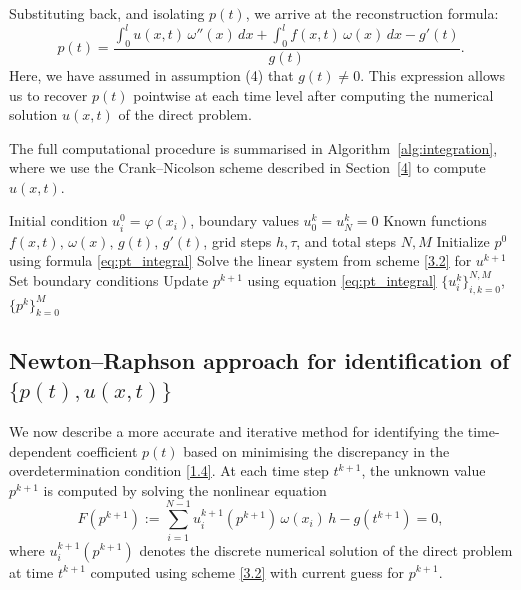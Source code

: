 \documentclass[reqno]{amsart}
\begin{document}
Substituting back, and isolating \( p(t) \), we arrive at the reconstruction formula:
\begin{equation}\label{eq:pt_integral}
p(t) = \frac{\int_0^l u(x,t)\, \omega''(x)\, dx + \int_0^l f(x,t)\, \omega(x)\, dx - g'(t) }{ g(t) }.
\end{equation}
Here, we have assumed in assumption (4) that $g(t) \neq 0$.
This expression allows us to recover \( p(t) \) pointwise at each time level after computing the numerical solution \( u(x,t) \) of the direct problem.

\medskip

The full computational procedure is summarised in Algorithm~\ref{alg:integration}, where we use the Crank–Nicolson scheme described in Section~\ref{4} to compute \( u(x,t) \).

\begin{algorithm}[H]
\caption{Integration-based method for identifying \( \{p(t), u(x,t)\} \)}
\label{alg:integration}
\begin{algorithmic}[1]
\Require Initial condition \( u_i^0 = \varphi(x_i) \), boundary values \( u_0^k = u_N^k = 0 \)
\Require Known functions \( f(x,t),\, \omega(x),\, g(t),\, g'(t) \), grid steps \( h, \tau \), and total steps \( N, M \)
\State Initialize \( p^0 \) using formula \eqref{eq:pt_integral}
    \State Solve the linear system from scheme \eqref{3.2} for \( u^{k+1} \)
    \State Set boundary conditions
    \State Update \( p^{k+1} \) using equation \eqref{eq:pt_integral}
\EndFor
\State \Return \( \{ u_i^k \}_{i,k=0}^{N,M} \), \( \{ p^k \}_{k=0}^M \)
\end{algorithmic}
\end{algorithm}

\subsection{Newton--Raphson approach for identification of \texorpdfstring{$\{p(t), u(x,t)\}$}{p(t), u(x,t)}}

We now describe a more accurate and iterative method for identifying the time-dependent coefficient \( p(t) \) based on minimising the discrepancy in the overdetermination condition \eqref{1.4}. At each time step \( t^{k+1} \), the unknown value \( p^{k+1} \) is computed by solving the nonlinear equation
\begin{equation} \label{eq:newton_residual}
F(p^{k+1}) := \sum_{i=1}^{N-1} u_i^{k+1}(p^{k+1})\, \omega(x_i)\, h - g(t^{k+1}) = 0,
\end{equation}
where \( u_i^{k+1}(p^{k+1}) \) denotes the discrete numerical solution of the direct problem at time \( t^{k+1} \) computed using scheme \eqref{3.2} with current guess for \( p^{k+1} \).
\end{document}
